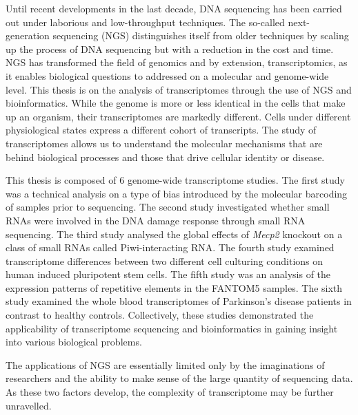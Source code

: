 Until recent developments in the last decade, DNA sequencing has been carried out under laborious and low-throughput techniques. The so-called next-generation sequencing (NGS) distinguishes itself from older techniques by scaling up the process of DNA sequencing but with a reduction in the cost and time. NGS has transformed the field of genomics and by extension, transcriptomics, as it enables biological questions to addressed on a molecular and genome-wide level. This thesis is on the analysis of transcriptomes through the use of NGS and bioinformatics. While the genome is more or less identical in the cells that make up an organism, their transcriptomes are markedly different. Cells under different physiological states express a different cohort of transcripts. The study of transcriptomes allows us to understand the molecular mechanisms that are behind biological processes and those that drive cellular identity or disease.

This thesis is composed of 6 genome-wide transcriptome studies. The first study was a technical analysis on a type of bias introduced by the molecular barcoding of samples prior to sequencing. The second study investigated whether small RNAs were involved in the DNA damage response through small RNA sequencing. The third study analysed the global effects of \textit{Mecp2} knockout on a class of small RNAs called Piwi-interacting RNA. The fourth study examined transcriptome differences between two different cell culturing conditions on human induced pluripotent stem cells. The fifth study was an analysis of the expression patterns of repetitive elements in the FANTOM5 samples. The sixth study examined the whole blood transcriptomes of Parkinson's disease patients in contrast to healthy controls. Collectively, these studies demonstrated the applicability of transcriptome sequencing and bioinformatics in gaining insight into various biological problems.

The applications of NGS are essentially limited only by the imaginations of researchers and the ability to make sense of the large quantity of sequencing data. As these two factors develop, the complexity of transcriptome may be further unravelled.
